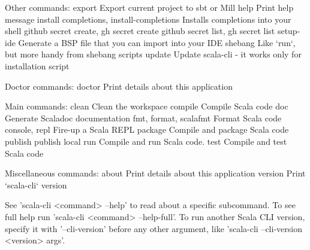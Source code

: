 \begin{itemize}
\begin{REPLsmall}
Other commands:
  export                                    Export current project to sbt or Mill
  help                                      Print help message
  install completions, install-completions  Installs completions into your shell
  github secret create, gh secret create
  github secret list, gh secret list
  setup-ide                                 Generate a BSP file that you can import into your IDE
  shebang                                   Like `run`, but more handy from shebang scripts
  update                                    Update scala-cli - it works only for installation script

Doctor commands:
  doctor  Print details about this application

Main commands:
  clean                  Clean the workspace
  compile                Compile Scala code
  doc                    Generate Scaladoc documentation
  fmt, format, scalafmt  Format Scala code
  console, repl          Fire-up a Scala REPL
  package                Compile and package Scala code
  publish
  publish local
  run                    Compile and run Scala code.
  test                   Compile and test Scala code

Miscellaneous commands:
  about    Print details about this application
  version  Print `scala-cli` version

See 'scala-cli <command> --help' to read about a specific subcommand. To see full help run 'scala-cli <command> --help-full'.
To run another Scala CLI version, specify it with '--cli-version' before any other argument, like 'scala-cli --cli-version <version> args'.
\end{REPLsmall}
\end{itemize}






